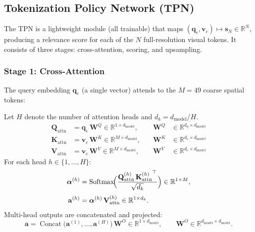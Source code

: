 \documentclass[11pt,a4paper]{article}
\DeclareMathOperator{\Softmax}{Softmax}
\DeclareMathOperator{\Concat}{Concat}
\newcommand{\R}{\mathbb{R}}
\newcommand{\vc}{\mathbf{v}_c}
\newcommand{\qe}{\mathbf{q}_e}
\newcommand{\vs}{\mathbf{s}}
\begin{document}
\subsection{Tokenization Policy Network (TPN)}
\label{subsec:tpn}

The TPN is a lightweight module (all trainable) that maps
$(\qe, \vc) \mapsto \vs_N \in \R^N$, producing a relevance score for each
of the $N$ full-resolution visual tokens.
It consists of three stages: cross-attention, scoring, and upsampling.

\subsubsection{Stage 1: Cross-Attention}

The query embedding $\qe$ (a single vector) attends to the $M{=}49$ coarse
spatial tokens:

\begin{definitionbox}[title={TPN Cross-Attention}]
Let $H$ denote the number of attention heads and $d_k = d_{\mathrm{model}}/H$.
\begin{align}
  \mathbf{Q}_{\mathrm{attn}} &= \qe\, \mathbf{W}^Q \in \R^{1 \times d_{\mathrm{model}}},
    &\quad \mathbf{W}^Q &\in \R^{d_q \times d_{\mathrm{model}}} \label{eq:q_proj} \\
  \mathbf{K}_{\mathrm{attn}} &= \vc\, \mathbf{W}^K \in \R^{M \times d_{\mathrm{model}}},
    &\quad \mathbf{W}^K &\in \R^{d_c \times d_{\mathrm{model}}} \label{eq:k_proj} \\
  \mathbf{V}_{\mathrm{attn}} &= \vc\, \mathbf{W}^V \in \R^{M \times d_{\mathrm{model}}},
    &\quad \mathbf{W}^V &\in \R^{d_c \times d_{\mathrm{model}}} \label{eq:v_proj}
\end{align}
For each head $h \in \{1,\ldots,H\}$:
\begin{align}
  \boldsymbol{\alpha}^{(h)}
    &= \Softmax\!\Bigl(
      \frac{\mathbf{Q}_{\mathrm{attn}}^{(h)}\,
            {\mathbf{K}_{\mathrm{attn}}^{(h)}}^\top}
           {\sqrt{d_k}}
    \Bigr) \in \R^{1 \times M}, \label{eq:attn_weights} \\[3pt]
  \mathbf{a}^{(h)}
    &= \boldsymbol{\alpha}^{(h)}\, \mathbf{V}_{\mathrm{attn}}^{(h)}
    \in \R^{1 \times d_k}. \label{eq:attn_out}
\end{align}
Multi-head outputs are concatenated and projected:
\begin{equation}
  \mathbf{a} = \Concat\!\bigl(\mathbf{a}^{(1)}, \ldots,
    \mathbf{a}^{(H)}\bigr)\, \mathbf{W}^O
    \in \R^{1 \times d_{\mathrm{model}}},
  \qquad \mathbf{W}^O \in \R^{d_{\mathrm{model}} \times d_{\mathrm{model}}}.
  \label{eq:multihead}
\end{equation}
\end{definitionbox}
\end{document}
